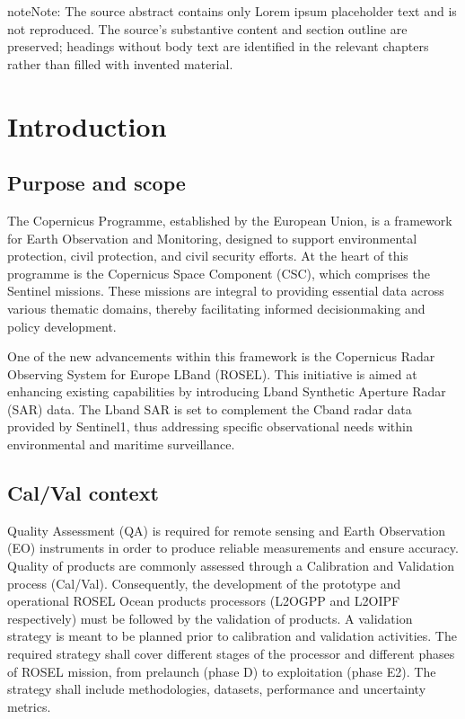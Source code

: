 \documentclass[a4paper,10pt,english]{sphinxmanual}
\begin{document}
\begin{sphinxadmonition}{note}{Note:}
\sphinxAtStartPar
The source abstract contains only Lorem ipsum placeholder text and is not
reproduced. The source’s substantive content and section outline are
preserved; headings without body text are identified in the relevant
chapters rather than filled with invented material.
\end{sphinxadmonition}

\sphinxstepscope


\chapter{Introduction}
\label{\detokenize{01_introduction:introduction}}\label{\detokenize{01_introduction::doc}}

\section{Purpose and scope}
\label{\detokenize{01_introduction:purpose-and-scope}}
\sphinxAtStartPar
The Copernicus Programme, established by the European Union, is a framework for Earth Observation and Monitoring, designed to support environmental protection, civil protection, and civil security efforts. At the heart of this programme is the Copernicus Space Component (CSC), which comprises the Sentinel missions. These missions are integral to providing essential data across various thematic domains, thereby facilitating informed decision\sphinxhyphen{}making and policy development.

\sphinxAtStartPar
One of the new advancements within this framework is the Copernicus Radar Observing System for Europe \textendash{} L\sphinxhyphen{}Band (ROSE\sphinxhyphen{}L). This initiative is aimed at enhancing existing capabilities by introducing L\sphinxhyphen{}band Synthetic Aperture Radar (SAR) data. The L\sphinxhyphen{}band SAR is set to complement the C\sphinxhyphen{}band radar data provided by Sentinel\sphinxhyphen{}1, thus addressing specific observational needs within environmental and maritime surveillance.


\section{Cal/Val context}
\label{\detokenize{01_introduction:cal-val-context}}
\sphinxAtStartPar
Quality Assessment (QA) is required for remote sensing and Earth Observation (EO) instruments in order to produce reliable measurements and ensure accuracy. Quality of products are commonly assessed through a Calibration and Validation process (Cal/Val). Consequently, the development of the prototype and operational ROSE\sphinxhyphen{}L Ocean products processors (L2O\sphinxhyphen{}GPP and L2O\sphinxhyphen{}IPF respectively) must be followed by the validation of products. A validation strategy is meant to be planned prior to calibration and validation activities. The required strategy shall cover different stages of the processor and different phases of ROSE\sphinxhyphen{}L mission, from pre\sphinxhyphen{}launch (phase D) to exploitation (phase E2). The strategy shall include methodologies, datasets, performance and uncertainty metrics.
\end{document}
